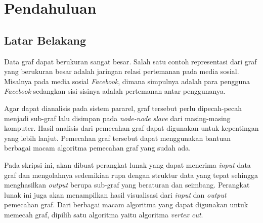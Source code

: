
\chapter{Pendahuluan}
\label{chap:intro}
   
\section{Latar Belakang}
\label{sec:label}


Data graf dapat berukuran sangat besar. Salah satu contoh representasi dari graf yang berukuran besar adalah jaringan relasi pertemanan pada media sosial. Misalnya pada media sosial {\it Facebook}, dimana simpulnya adalah para pengguna {\it Facebook} sedangkan sisi-sisinya adalah pertemanan antar penggunanya.

Agar dapat dianalisis pada sistem pararel, graf tersebut perlu dipecah-pecah menjadi sub-graf lalu disimpan pada {\it node-node} {\it slave} dari masing-masing komputer. Hasil analisis dari pemecahan graf dapat digunakan untuk kepentingan yang lebih lanjut. Pemecahan graf tersebut dapat menggunakan bantuan berbagai macam algoritma pemecahan graf yang sudah ada.

Pada skripsi ini, akan dibuat perangkat lunak yang dapat menerima {\it input} data graf dan mengolahnya sedemikian rupa dengan struktur data yang tepat sehingga menghasilkan {\it output} berupa sub-graf yang beraturan dan seimbang. Perangkat lunak ini juga akan menampilkan hasil visualisasi dari {\it input} dan {\it output} pemecahan graf. Dari berbagai macam algoritma yang dapat digunakan untuk memecah graf, dipilih satu algoritma yaitu algoritma {\it vertex cut}.



